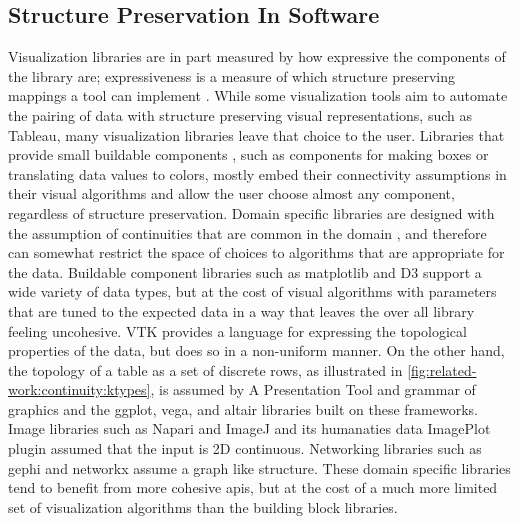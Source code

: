 \documentclass[10pt,journal,compsoc]{IEEEtran}
\theoremstyle{definition}
\theoremstyle{remark}
\begin{document}
\subsection{Structure Preservation In Software}
\label{sec:related-work:software}
Visualization libraries are in part measured by how expressive the components of the library are; expressiveness is a measure of which structure preserving mappings a tool can implement \cite{mackinlayAutomaticDesignGraphical1987}. While some visualization tools aim to automate the pairing of data with structure preserving visual representations, such as Tableau\cite{StoltePolaris2002,hanrahanVizQL2006,MackinlayShowme2007}, many visualization libraries leave that choice to the user. Libraries that provide small buildable components \cite{wongsuphasawatNavigatingWideWorld2021}, such as components for making boxes or translating data values to colors, mostly embed their connectivity assumptions in their visual algorithms and allow the user choose almost any component, regardless of structure preservation. Domain specific libraries are designed with the assumption of continuities that are common in the domain \cite{HeerSoftware2006}, and therefore can somewhat restrict the space of choices to algorithms that are appropriate for the data. 
Buildable component libraries such as matplotlib\cite{hunterMatplotlib2DGraphics2007} and D3\cite{bostockDataDrivenDocuments2011} support a wide variety of data types, but at the cost of visual algorithms with  parameters that are tuned to the expected data in a way that leaves the over all library feeling uncohesive. VTK\cite{hanwellVisualizationToolkitVTK2015,geveciVTK2012} provides a language for expressing the topological properties of the data, but does so in a non-uniform manner. On the other hand, the topology of a table as a set of discrete rows, as illustrated in \autoref{fig:related-work:continuity:ktypes}, is assumed by 
A Presentation Tool\cite{mackinlayAutomatingDesignGraphical1986, mackinlayAutomatingDesignGraphical1986} and grammar of graphics\cite{wilkinsonGrammarGraphics2005} and the ggplot\cite{wickhamGgplot2ElegantGraphics2016a}, vega\cite{satyanarayanDeclarativeInteractionDesign2014}, and altair\cite{vanderplasAltairInteractiveStatistical2018} libraries built on these frameworks. Image libraries such as Napari\cite{nicholas_sofroniew_2021_4533308} and ImageJ\cite{schneiderNIHImageImageJ2012} and its humanaties data ImagePlot\cite{studiesCulturevisImageplot2021} plugin assumed that the input is 2D continuous. Networking libraries such as gephi\cite{bastianGephiOpenSource2009} and networkx\cite{HagbergExploringNetwork2008} assume a graph like structure. These domain specific libraries tend to benefit from more cohesive apis, but at the cost of a much more limited set of visualization algorithms than the building block libraries. 
\end{document}

